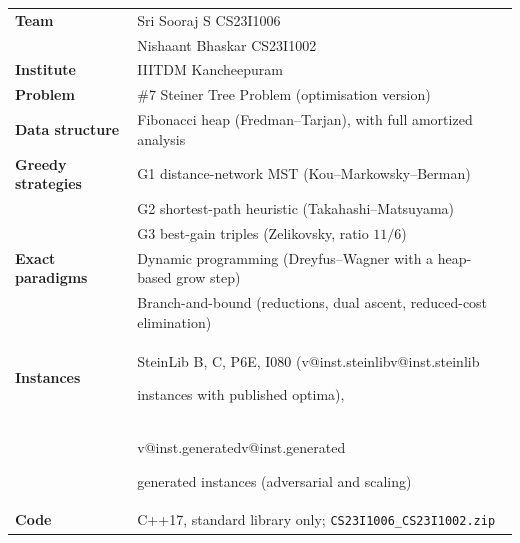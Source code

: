 \documentclass[11pt,a4paper]{article}
\makeatletter
\theoremstyle{plain}\newtheorem{theorem}{Theorem}[section]
\theoremstyle{definition}\newaliascnt{definition}{theorem}\newtheorem{definition}[definition]{Definition}\aliascntresetthe{definition}
\newcommand{\val}[1]{\ifcsname v@#1\endcsname\csname v@#1\endcsname\else\PackageError{report}{missing value #1}{}\fi}
\makeatother
\begin{document}
\begin{titlepage}
\vspace*{7.2cm}

\noindent\begin{tabular}{@{}p{4.2cm}p{10.5cm}@{}}
\textbf{Team} & Sri Sooraj S \hfill CS23I1006\\
 & Nishaant Bhaskar \hfill CS23I1002\\[6pt]
\textbf{Institute} & IIITDM Kancheepuram\\[6pt]
\textbf{Problem} & \#7 Steiner Tree Problem (optimisation version)\\[6pt]
\textbf{Data structure} & Fibonacci heap (Fredman--Tarjan), with full amortized analysis\\[6pt]
\textbf{Greedy strategies} & G1 distance-network MST (Kou--Markowsky--Berman)\\
 & G2 shortest-path heuristic (Takahashi--Matsuyama)\\
 & G3 best-gain triples (Zelikovsky, ratio \(11/6\))\\[6pt]
\textbf{Exact paradigms} & Dynamic programming (Dreyfus--Wagner with a heap-based grow step)\\
 & Branch-and-bound (reductions, dual ascent, reduced-cost elimination)\\[6pt]
\textbf{Instances} & SteinLib B, C, P6E, I080 (\val{inst.steinlib} instances with published optima),\\
 & \val{inst.generated} generated instances (adversarial and scaling)\\[6pt]
\textbf{Code} & C++17, standard library only; \texttt{CS23I1006\_CS23I1002.zip}
\end{tabular}


\end{titlepage}
\end{document}
